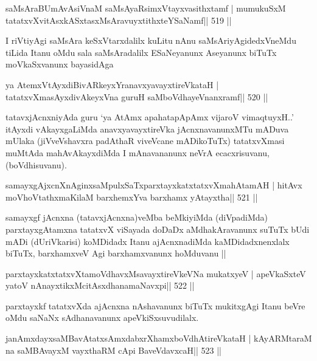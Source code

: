 \begin{shl}
saMsAraBUmAvAsiVnaM saMsAyaRsimxVtayxvasithxtamf |
mumukuSxM tatatxvXvitAsxkASxtasxMsAravuyxtithxteYSaNamf\hfill || 519 ||
\end{shl}

\begin{artha}
I riVtiyAgi saMsAra keSxVtarxdalilx kuLitu nAnu saMsAriyAgidedxVneMdu
tiLida Itanu oMdu sala saMsAradalilx ESaNeyanunx Aseyanunx biTuTx
moVkaSxvanunx bayasidAga 
\end{artha}

\begin{shl}
ya AtemxVtAyxdiBivARkeyxYranavxyavayxtireVkataH |
tatatxvXmasAyxdivAkeyxVna guruH saMboVdhayeVnanxramf\hfill || 520 ||
\end{shl}

\begin{artha}
tatavxjAcnxniyAda guru `ya AtAmx apahatapApAmx vijaroV vimaqtuyxH..' itAyxdi vAkayxgaLiMda anavxyavayxtireVka jAcnxnavanunxMTu mADuva mUlaka (jiVveVshavxra padAthaR viveVcane mADikoTuTx) tatatxvXmasi muMtAda mahAvAkayxdiMda I mAnavananunx neVrA ecacxrisuvanu, (boVdhisuvanu).
\end{artha}

\begin{shl}
samayxgAjxcnXnAginxsaMpulxSaTxparxtayxkatxtatxvXmahAtamAH |
hitAvx moVhoVtathxmaKilaM barxhemxYva barxhamx yAtayxtha\hfill || 521 ||
\end{shl}

\begin{artha}
samayxgf jAcnxna (tatavxjAcnxna)veMba beMkiyiMda (diVpadiMda)
parxtayxgAtamxna tatatxvX viSayada doDaDx aMdhakAravanunx suTuTx bUdi
mADi (dUriVkarisi) koMDidadx Itanu ajAcnxnadiMda kaMDidadxnenxlalx
biTuTx, barxhamxveV Agi barxhamxvanunx hoMduvanu || 
\end{artha}

\begin{shl}
parxtayxkatxtatxvXtamoVdhavxMsavayxtireVkeVNa mukatxyeV |
apeVkaSxteV yatoV nAnayxtikxMcitAsxdhanamaNavxpi\hfill || 522 ||
\end{shl}

\begin{artha}
parxtayxkf tatatxvXda ajAcnxna nAshavanunx biTuTx mukitxgAgi Itanu beVre
oMdu saNaNx sAdhanavanunx apeVkiSxsuvudilalx.
\end{artha}

\begin{shl}
janAmxdayxsaMBavAtatxsAmxdabxrXhamxboVdhAtireVkataH |
kAyARMtaraM na saMBAvayxM vayxthaRM cApi BaveVdavxcaH\hfill || 523 ||
\end{shl}

